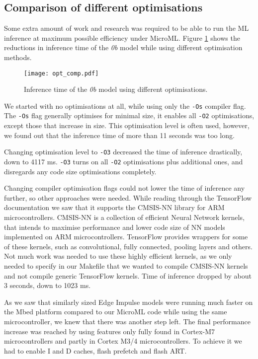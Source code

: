 \subsection{ Comparison of different optimisations}

Some extra amount of work and research was required to be able to run the ML inference at maximum possible efficiency under MicroML.
Figure \ref{opt_comp} shows the reductions in inference time of the \textit{0b} model while using different optimisation methods.
\newline

\begin{figure}[ht]
    \centering
    \texttt{[image: opt\_comp.pdf]}
    \caption{ Inference time of the \textit{0b} model using different optimisations.}
    \label{opt_comp}
\end{figure}

We started with no optimisations at all, while using only the \verb|-Os| compiler flag.
The \verb|-Os| flag generally optimises for minimal size, it enables all \verb|-O2| optimisations, except those that increase in size.
This optimisation level is often used, however, we found out that the inference time of more than 11 seconds was too long.

Changing optimisation level to \verb|-O3| decreased the time of inference drastically, down to 4117 \si{\milli\second}.
\verb|-O3| turns on all \verb|-O2| optimisations plus additional ones, and disregards any code size optimisations completely.

Changing compiler optimisation flags could not lower the time of inference any further, so other approaches were needed.
While reading through the TensorFlow documentation we saw that it supports the CMSIS-NN library for ARM microcontrollers.
CMSIS-NN is a collection of efficient Neural Network kernels, that intends to maximise performance and lower code size of NN models implemented on ARM microcontrollers.
TensorFlow provides wrappers for some of these kernels, such as convolutional, fully connected, pooling layers and others.
Not much work was needed to use these highly efficient kernels, as we only needed to specify in our Makefile that we wanted to compile CMSIS-NN kernels and not compile generic TensorFlow kernels. 
Time of inference dropped by about 3 seconds, down to 1023 \si{\milli\second}.

As we saw that similarly sized Edge Impulse models were running much faster on the Mbed platform compared to our MicroML code while using the same microcontroller, we knew that there was another step left.
The final performance increase was reached by using features only fully found in Cortex-M7 microcontrollers and partly in Cortex M3/4 microcontrollers. 
To achieve it we had to enable I and D caches, flash prefetch and flash ART.

